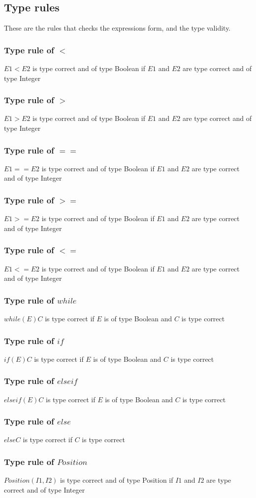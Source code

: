 	
\subsection{Type rules}
	These are the rules that checks the expressions form, and the type validity.
	
	\subsubsection*{Type rule of $<$}
		$E1 < E2$ is type correct and of type Boolean
		if $E1$ and $E2$ are type correct and of type Integer
	\subsubsection*{Type rule of $>$}
		$E1 > E2$ is type correct and of type Boolean
		if $E1$ and $E2$ are type correct and of type Integer
	\subsubsection*{Type rule of $==$}
		$E1 == E2$ is type correct and of type Boolean
		if $E1$ and $E2$ are type correct and of type Integer
	\subsubsection*{Type rule of $>=$}
		$E1 >= E2$ is type correct and of type Boolean
		if $E1$ and $E2$ are type correct and of type Integer
	\subsubsection*{Type rule of $<=$}
		$E1 <= E2$ is type correct and of type Boolean
		if $E1$ and $E2$ are type correct and of type Integer
	\subsubsection*{Type rule of $while$}
		$while(E){C}$ is type correct
		if $E$ is of type Boolean and $C$ is type correct
	\subsubsection*{Type rule of $if$}
		$if(E){C}$ is type correct
		if $E$ is of type Boolean and $C$ is type correct
	\subsubsection*{Type rule of $else if$}
		$else if(E){C}$ is type correct
		if $E$ is of type Boolean and $C$ is type correct
	\subsubsection*{Type rule of $else$}
		$else{C}$ is type correct
		if $C$ is type correct
	
	\subsubsection*{Type rule of $Position$}
		$Position(I1,I2)$ is type correct and of type Position
		if $I1$ and $I2$ are type correct and of type Integer	